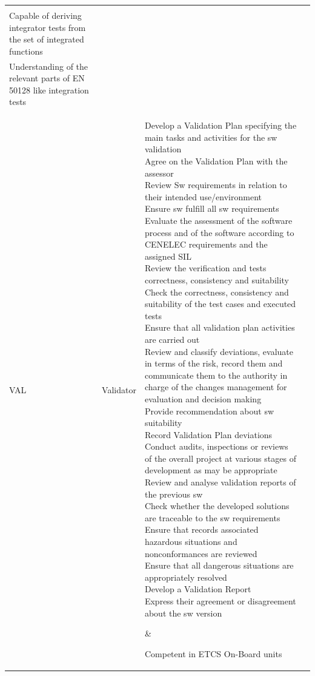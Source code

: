 \documentclass{template/openetcs_article}
\begin{document}
\begin{landscape}
\begin{appendices}
\begin{center}
\begin{longtable}{|m{1cm}|m{}|m{11cm}|m{10cm}|}
{Understanding the design and functionality requirements for intermediated development levels\\
Capable of deriving \gls{integrator} tests from the set of integrated functions\\
Understanding of the relevant parts of EN 50128 like integration tests}
\\\hline
\gls{VAL} &
Validator &
\parbox{11cm}{\raggedright
Develop a Validation Plan specifying the main tasks and activities for the sw validation\\
Agree on the Validation Plan with the \gls{assessor}\\
Review Sw requirements in relation to their intended use/environment\\
Ensure sw fulfill all sw requirements\\
Evaluate the assessment of the software process and of the software according to CENELEC requirements and the assigned \gls{SIL}\\
Review the verification and tests correctness, consistency and suitability \\
Check the correctness, consistency and suitability of the test cases and executed tests\\
Ensure that all validation plan activities are carried out\\
Review and classify deviations, evaluate in terms of the risk, record them and communicate them to the authority in charge of the changes management for evaluation and decision making\\ 
Provide recommendation about sw suitability\\
Record Validation Plan deviations\\
Conduct audits, inspections or reviews of the overall project at various stages of development as may be appropriate\\
Review and analyse validation reports of the previous sw\\
Check whether the developed solutions are traceable to the sw requirements \\
Ensure that records associated hazardous situations and nonconformances are reviewed\\
Ensure that all dangerous situations are appropriately resolved\\
Develop a Validation Report\\
Express their agreement or disagreement about the sw version  
}&
\parbox{10cm}{\raggedright
Competent in \gls{ETCS} On-Board units\\
}
\end{longtable}
\end{center}
\end{appendices}
\end{landscape}
\end{document}

